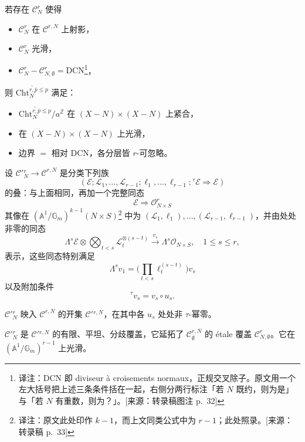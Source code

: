 若存在 $\mathcal{C}^{r}_{N}$ 使得

\begin{itemize}
\item $\mathcal{C}^{r}_{N}$ 在 $\mathcal{C}^{r,N}$ 上射影，
\item $\mathcal{C}^{r}_{N}$ 光滑，
\item $\mathcal{C}^{r}_{N}-\mathcal{C}^{r}_{N,\emptyset}=\mathrm{DCN}$\footnote{译注：$\mathrm{DCN}$ 即 diviseur à croisements normaux，正规交叉除子。原文用一个左大括号把上述三条条件括在一起，右侧分两行标注「若 $N$ 既约，则为是」与「若 $N$ 有重数，则为？」。[来源：转录稿图注 p.~32]}，
\end{itemize}

则 $\overline{\mathrm{Cht}^{r,\bar{p}\le p}_{N}}$ 满足：

\begin{itemize}
\item $\overline{\mathrm{Cht}^{r,\bar{p}\le p}_{N}}/a^{\mathbb{Z}}$ 在 $(X-N)\times(X-N)$ 上紧合，
\item 在 $(X-N)\times(X-N)$ 上光滑，
\item 边界 $=$ 相对 $\mathrm{DCN}$，各分层皆 $r$-可忽略。
\end{itemize}

设 $\mathcal{C}'{}^{r}_{N}\to\mathcal{C}^{r,N}$ 是分类下列族
\[
(\mathcal{E};\mathcal{L}_{1},\ldots,\mathcal{L}_{r-1};\ell_{1},\ldots,\ell_{r-1};{}^{\tau}\mathcal{E}\Rightarrow\mathcal{E})
\]
的叠：与上面相同，再加一个完整同态
\[
\mathcal{E}\Rightarrow\mathcal{O}^{r}_{N\times S}
\]
其像在 $(\mathbb{A}^{1}/\mathbb{G}_{m})^{k-1}(N\times S)$\footnote{译注：原文此处印作 $k-1$，而上文同类公式中为 $r-1$；此处照录。[来源：转录稿 p.~33]} 中为 $(\mathcal{L}_{1},\ell_{1}),\ldots,(\mathcal{L}_{r-1},\ell_{r-1})$，并由处处非零的同态
\[
\Lambda^{s}\mathcal{E}\otimes\bigotimes_{t<s}\mathcal{L}_{t}^{\otimes(s-t)}\xrightarrow{v_{s}}\Lambda^{s}\mathcal{O}_{N\times S},\quad 1\le s\le r,
\]
表示，这些同态特别满足
\[
\Lambda^{s}v_{1}=\Big(\prod_{t<s}\ell_{t}^{(s-t)}\Big)v_{s}
\]
以及附加条件
\[
{}^{\tau}v_{s}=v_{s}\circ u_{s}.
\]

$\mathcal{C}'{}^{r}_{N}$ 映入 $\mathcal{C}^{r,N}$ 的开集 $\mathcal{C}'{}^{r,N}$，在其中各 $u_{s}$ 处处非 $\tau$-幂零。

\begin{lemma*}
$\mathcal{C}'{}^{r}_{N}$ 是 $\mathcal{C}'{}^{r,N}$ 的有限、平坦、分歧覆盖，它延拓了 $\mathcal{C}^{r,N}_{\emptyset}$ 的 étale 覆盖 $\mathcal{C}^{r}_{N,\emptyset}$。它在 $(\mathbb{A}^{1}/\mathbb{G}_{m})^{r-1}$ 上光滑。
\end{lemma*}

